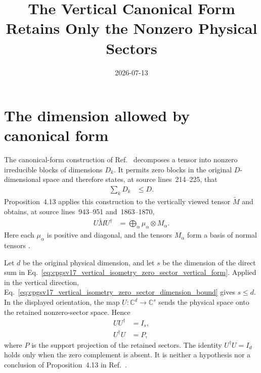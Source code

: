 \documentclass{article}
\title{The Vertical Canonical Form Retains Only the Nonzero Physical Sectors}
\author{}
\date{2026-07-13}
\begin{document}
\maketitle
{}

\section{The dimension allowed by canonical form}

The canonical-form construction of
Ref.~\cite{Cirac2016MPDO_arXiv} decomposes a tensor into nonzero irreducible
blocks of dimensions $D_k$. It permits zero blocks in the original
$D$-dimensional space and therefore states, at source lines~214--225, that
\begin{align}
    \sum_k D_k
        &\leq D.
    \label{eq:cpgsv17_vertical_isometry_zero_sector_dimension_bound}
\end{align}
Proposition~4.13 applies this construction to the vertically viewed tensor
$\widetilde M$ and obtains, at source lines~943--951 and~1863--1870,
\begin{align}
    U\widetilde M U^\dagger
        &=
        \bigoplus_\alpha\mu_\alpha\otimes M_\alpha.
    \label{eq:cpgsv17_vertical_isometry_zero_sector_vertical_form}
\end{align}
Here each $\mu_\alpha$ is positive and diagonal, and the tensors
$M_\alpha$ form a basis of normal tensors
\cite[Proposition~4.13]{Cirac2016MPDO_arXiv}.

Let $d$ be the original physical dimension, and let $s$ be the dimension of
the direct sum in
Eq.~\ref{eq:cpgsv17_vertical_isometry_zero_sector_vertical_form}. Applied in
the vertical direction,
Eq.~\ref{eq:cpgsv17_vertical_isometry_zero_sector_dimension_bound} gives
$s\leq d$. In the displayed orientation, the map
$U:\mathbb C^d\to\mathbb C^s$ sends the physical space onto the retained
nonzero-sector space. Hence
\begin{align}
    UU^\dagger
        &=I_s,
    \label{eq:cpgsv17_vertical_isometry_zero_sector_coisometry}\\
    U^\dagger U
        &=P,
    \label{eq:cpgsv17_vertical_isometry_zero_sector_support_projection}
\end{align}
where $P$ is the support projection of the retained sectors. The identity
$U^\dagger U=I_d$ holds only when the zero complement is absent. It is neither
a hypothesis nor a conclusion of Proposition~4.13 in
Ref.~\cite{Cirac2016MPDO_arXiv}.
\end{document}
